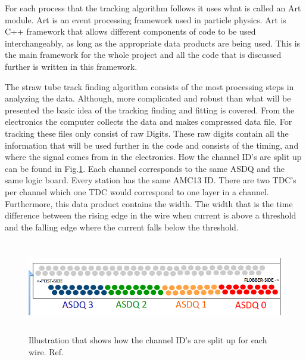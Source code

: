 \documentclass[./Thesis]{subfiles}
\begin{document}

For each process that the tracking algorithm follows it uses what is called an Art module. Art is an event processing framework used in particle physics.\cite{art}  Art is C++ framework that allows different components of code to be used interchangeably, as long as the appropriate data products are being used. This is the main framework for the whole project and all the code that is discussed further is written in this framework.

	The straw tube track finding algorithm consists of the most processing steps in analyzing the data.  Although, more complicated and robust than what will be presented the basic idea of the tracking finding and fitting is covered.  From the electronics the computer collects the data and makes compressed data file.  For tracking these files only consist of raw Digits.  These raw digits contain all the information that will be used further in the code and consists of the timing, and where the signal comes from in the electronics. How the channel ID's are split up can be found in Fig.\ref{fig:channelID}. Each channel corresponds to the same ASDQ and the same logic board. Every station has the same AMC13 ID. There are two TDC's per channel which one TDC would correspond to one layer in a channel. Furthermore, this data product contains the width. The width that is the time difference between the rising edge in the wire when current is above a threshold and the falling edge where the current falls below the threshold.

	
\begin{figure}
	\centerline{\includegraphics[height=40mm]{ADCSplitUp.png}}
	\caption[Top View of Tracker Electronics]{ Illustration that shows how the channel ID's are split up for each wire.  Ref.\cite{jPrice}
	}
	\label{fig:channelID}
\end{figure} 
\end{document}
